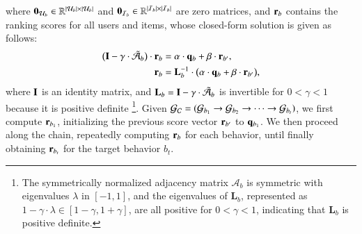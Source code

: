 where $\mathbf{0}_{\mathcal{U}_{b}} \in \mathbb{R}^{|\mathcal{U}_{b}| \times |\mathcal{U}_{b}|}$ and $\mathbf{0}_{\mathcal{I}_{b}} \in \mathbb{R}^{|\mathcal{I}_{b}| \times |\mathcal{I}_{b}|}$ are zero matrices, and $\mathbf{r}_{b}$ contains the ranking scores for all users and items, whose closed-form solution is given as follows:
\begin{align}
    \label{eq:cascrank:closed}
    \begin{split}
    \big(\mathbf{I} - \gamma \cdot \tilde{\mathbf{\mathcal{A}}}_b \big) \cdot \mathbf{r}_{b} &= \alpha \cdot \mathbf{q}_{b} + \beta \cdot \mathbf{r}_{b'}, \\
    \mathbf{r}_{b} &= \mathbf{L}_b^{-1} \cdot
    \big(
        \alpha \cdot \mathbf{q}_{b} + \beta \cdot \mathbf{r}_{b'}
    \big),
    \end{split}
\end{align}
where 
$\mathbf{I}$ is an identity matrix, and
$\mathbf{L}_b = \mathbf{I} - \gamma \cdot \tilde{\mathbf{\mathcal{A}}}_b$ is invertible for $0 < \gamma < 1$ because it is positive definite
\footnote{
The symmetrically normalized adjacency matrix $\mathcal{A}_b$ is symmetric with eigenvalues $\lambda$ in $[-1, 1]$, and the eigenvalues of $\mathbf{L}_b$, represented as $1 - \gamma \cdot \lambda \in [1 - \gamma, 1 + \gamma]$, are all positive for $0 < \gamma < 1$, indicating that $\mathbf{L}_b$ is positive definite.
}.
Given $\mathcal{G}_{\mathcal{C}} = (\mathcal{G}_{b_1} \rightarrow \mathcal{G}_{b_2} \rightarrow \cdots \rightarrow \mathcal{G}_{b_t})$, we first compute $\mathbf{r}_{b_1}$, initializing the previous score vector $\mathbf{r}_{b'}$ to $\mathbf{q}_{b_1}$. 
We then proceed along the chain, repeatedly computing $\mathbf{r}_{b}$ for each behavior, until finally obtaining $\mathbf{r}_{b_t}$ for the target behavior $b_t$.

